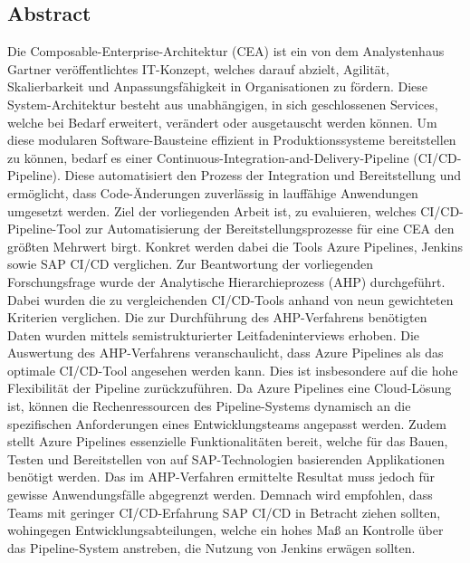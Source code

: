 \begin{center}
	\section*{Abstract}
\end{center}
Die Composable-Enterprise-Architektur (CEA) ist ein von dem Analystenhaus Gartner veröffentlichtes IT-Konzept, welches darauf abzielt, Agilität, Skalierbarkeit und Anpassungsfähigkeit in Organisationen zu fördern. Diese System-Architektur besteht aus unabhängigen, in sich geschlossenen Services, welche bei Bedarf erweitert, verändert oder ausgetauscht werden können. Um diese modularen Software-Bausteine effizient in Produktionssysteme bereitstellen zu können, bedarf es einer Continuous-Integration-and-Delivery-Pipeline (CI/CD-Pipeline). Diese automatisiert den Prozess der Integration und Bereitstellung und ermöglicht, dass Code-Änderungen zuverlässig in lauffähige Anwendungen umgesetzt werden.
Ziel der vorliegenden Arbeit ist, zu evaluieren, welches CI/CD-Pipeline-Tool zur Automatisierung der Bereitstellungsprozesse für eine CEA den größten Mehrwert birgt. Konkret werden dabei die Tools Azure Pipelines, Jenkins sowie SAP CI/CD verglichen. Zur Beantwortung der vorliegenden Forschungsfrage wurde der Analytische Hierarchieprozess (\acs{AHP}) durchgeführt. Dabei wurden die zu vergleichenden CI/CD-Tools anhand von neun gewichteten Kriterien verglichen. Die zur Durchführung des AHP-Verfahrens benötigten Daten wurden mittels semistrukturierter Leitfadeninterviews erhoben. Die Auswertung des AHP-Verfahrens veranschaulicht, dass Azure Pipelines als das optimale CI/CD-Tool angesehen werden kann. Dies ist insbesondere auf die hohe Flexibilität der Pipeline zurückzuführen. Da Azure Pipelines eine Cloud-Lösung ist, können die Rechenressourcen des Pipeline-Systems dynamisch an die spezifischen Anforderungen eines Entwicklungsteams angepasst werden. Zudem stellt Azure Pipelines essenzielle Funktionalitäten bereit, welche für das Bauen, Testen und Bereitstellen von auf SAP-Technologien basierenden Applikationen benötigt werden. Das im AHP-Verfahren ermittelte Resultat muss jedoch für gewisse Anwendungsfälle abgegrenzt werden. Demnach wird empfohlen, dass Teams mit geringer CI/CD-Erfahrung SAP CI/CD in Betracht ziehen sollten, wohingegen Entwicklungsabteilungen, welche ein hohes Maß an Kontrolle über das Pipeline-System anstreben, die Nutzung von Jenkins erwägen sollten.  